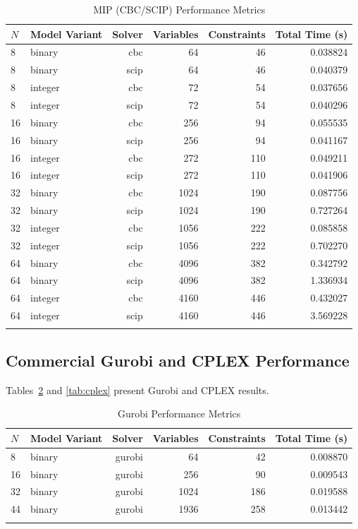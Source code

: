 \documentclass[a4paper,fleqn]{cas-sc}
\begin{document}
\begin{table}[htbp]
\centering
\caption{MIP (CBC/SCIP) Performance Metrics} \label{tab:mip}
\begin{tabular}{llrrrr}
\toprule
$N$ & Model Variant & Solver & Variables & Constraints & Total Time (s) \\
\midrule
8 & binary & cbc & 64 & 46 & 0.038824 \\
8 & binary & scip & 64 & 46 & 0.040379 \\
8 & integer & cbc & 72 & 54 & 0.037656 \\
8 & integer & scip & 72 & 54 & 0.040296 \\
16 & binary & cbc & 256 & 94 & 0.055535 \\
16 & binary & scip & 256 & 94 & 0.041167 \\
16 & integer & cbc & 272 & 110 & 0.049211 \\
16 & integer & scip & 272 & 110 & 0.041906 \\
32 & binary & cbc & 1024 & 190 & 0.087756 \\
32 & binary & scip & 1024 & 190 & 0.727264 \\
32 & integer & cbc & 1056 & 222 & 0.085858 \\
32 & integer & scip & 1056 & 222 & 0.702270 \\
64 & binary & cbc & 4096 & 382 & 0.342792 \\
64 & binary & scip & 4096 & 382 & 1.336934 \\
64 & integer & cbc & 4160 & 446 & 0.432027 \\
64 & integer & scip & 4160 & 446 & 3.569228 \\
\bottomrule
\tabularnewline
\end{tabular}
\end{table}

\subsection{Commercial Gurobi and CPLEX Performance}
Tables~\ref{tab:gurobi} and \ref{tab:cplex} present Gurobi and CPLEX results.

\begin{table}[htbp]
\centering
\caption{Gurobi Performance Metrics} \label{tab:gurobi}
\begin{tabular}{llrrrr}
\toprule
$N$ & Model Variant & Solver & Variables & Constraints & Total Time (s) \\
\midrule
8 & binary & gurobi & 64 & 42 & 0.008870 \\
16 & binary & gurobi & 256 & 90 & 0.009543 \\
32 & binary & gurobi & 1024 & 186 & 0.019588 \\
44 & binary & gurobi & 1936 & 258 & 0.013442 \\
\bottomrule
\tabularnewline
\end{tabular}
\end{table}
\end{document}
